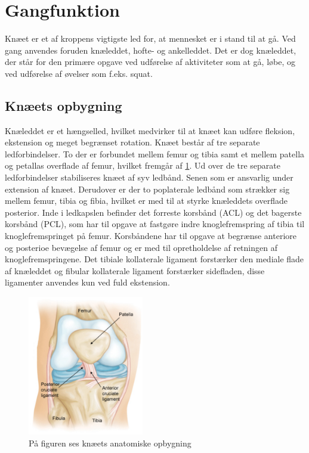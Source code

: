 \section{Gangfunktion}
Knæet er et af kroppens vigtigste led for, at mennesket er i stand til at gå. Ved gang anvendes foruden knæleddet, hofte- og ankelleddet. Det er dog knæleddet, der står for den primære opgave ved udførelse af aktiviteter som at gå, løbe, og ved udførelse af øvelser som f.eks. squat. 

\subsection{Knæets opbygning}
Knæleddet er et hængselled, hvilket medvirker til at knæet kan udføre fleksion, ekstension og meget begrænset rotation. Knæet består af tre separate ledforbindelser. To der er forbundet mellem femur og tibia samt et mellem patella og petallas overflade af femur, hvilket fremgår af \ref{fig:knae_anatomi}. Ud over de tre separate ledforbindelser stabiliseres knæet af syv ledbånd. Senen som er ansvarlig under extension af knæet. Derudover er der to poplaterale ledbånd som strækker sig mellem femur, tibia og fibia, hvilket er med til at styrke knæleddets overflade posterior. Inde i ledkapslen befinder det forreste korsbånd (ACL) og det bagerste korsbånd (PCL), som har til opgave at fastgøre indre knoglefremspring af tibia til knoglefremspringet på femur. Korsbåndene har til opgave at begrænse anteriore og posterioe bevægelse af femur og er med til opretholdelse af retningen af knoglefremspringene. Det tibiale kollaterale ligament forstærker den mediale flade af knæleddet og fibular kollaterale ligament forstærker sidefladen, disse ligamenter anvendes kun ved fuld ekstension. 

\begin{figure}
\centering
\includegraphics[width=0.45\textwidth]{figures/knae_anatomi}
\caption{På figuren ses knæets anatomiske opbygning}%
\label{fig:knae_anatomi}
\end{figure} 

